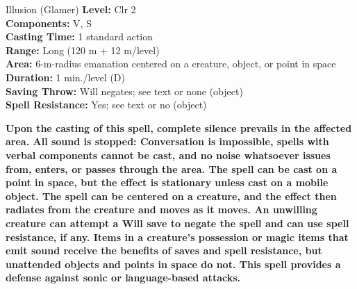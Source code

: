 {Illusion (Glamer)}
{
	\textbf{Level:}
	Clr 2\\
	\textbf{Components:}
	V, S\\
	\textbf{Casting Time:}
	1 standard action\\
	\textbf{Range:}
	Long (120 m + 12 m/level)\\
	\textbf{Area:}
	6-m-radius emanation centered on a creature, object, or point in space\\
	\textbf{Duration:}
	1 min./level (D)\\
	\textbf{Saving Throw:}
	Will negates; see text or none (object)\\
	\textbf{Spell Resistance:}
	Yes; see text or no (object)\\
}
{
	\textbf{	Upon the casting of this spell, complete silence prevails in the affected area. All sound is stopped: Conversation is impossible, spells with verbal components cannot be cast, and no noise whatsoever issues from, enters, or passes through the area. The spell can be cast on a point in space, but the effect is stationary unless cast on a mobile object. The spell can be centered on a creature, and the effect then radiates from the creature and moves as it moves. An unwilling creature can attempt a Will save to negate the spell and can use spell resistance, if any. Items in a creature's possession or magic items that emit sound receive the benefits of saves and spell resistance, but unattended objects and points in space do not. This spell provides a defense against sonic or language-based attacks.}

}
